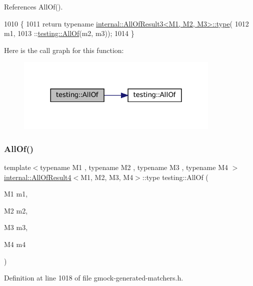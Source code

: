 References All\+Of().


\begin{DoxyCode}
1010                            \{
1011   \textcolor{keywordflow}{return} \textcolor{keyword}{typename} \hyperlink{namespacegenerate__debs_a50bc9a7ecac9584553e089a448bcde58}{internal::AllOfResult3<M1, M2, M3>::type}(
1012       m1,
1013       ::\hyperlink{namespacetesting_af7618e8606c1cb45738163688944e2b7}{testing::AllOf}(m2, m3));
1014 \}
\end{DoxyCode}
Here is the call graph for this function\+:
\nopagebreak
\begin{figure}[H]
\begin{center}
\leavevmode
\includegraphics[width=276pt]{namespacetesting_a75934d8ea6b986d2157a5ebfe68f9904_cgraph}
\end{center}
\end{figure}
\mbox{\label{namespacetesting_a4a9a119cde16e43b364f3573136857a1}} 
\subsubsection{\texorpdfstring{All\+Of()}{AllOf()}\hspace{0.1cm}{\footnotesize\ttfamily [3/9]}}
{\footnotesize\ttfamily template$<$typename M1 , typename M2 , typename M3 , typename M4 $>$ \\
\hyperlink{structtesting_1_1internal_1_1AllOfResult4}{internal\+::\+All\+Of\+Result4}$<$M1, M2, M3, M4$>$\+::type testing\+::\+All\+Of (\begin{DoxyParamCaption}\item[{M1}]{m1,  }\item[{M2}]{m2,  }\item[{M3}]{m3,  }\item[{M4}]{m4 }\end{DoxyParamCaption})\hspace{0.3cm}{\ttfamily [inline]}}



Definition at line 1018 of file gmock-\/generated-\/matchers.\+h.



